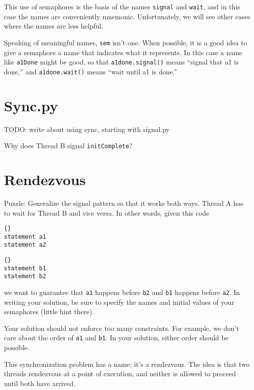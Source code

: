 \documentclass{book}
\begin{document}
This use of semaphores is the basis of the names {\tt signal}
and {\tt wait}, and in this case the names are conveniently
mnemonic.  Unfortunately, we will see other cases where the
names are less helpful.

Speaking of meaningful names, {\tt sem} isn't one.  When
possible, it is a good idea to give a semaphore a name
that indicates what it represents.  In this case a name like
{\tt a1Done} might be good, so that {\tt a1done.signal()} means
``signal that a1 is done,'' and {\tt a1done.wait()} means
``wait until a1 is done.''


\section{Sync.py}
\label{sync.py}

TODO: write about using sync, starting with signal.py

Why does Thread B signal {\tt initComplete}?



\section{Rendezvous}
\label{rendezvous}

Puzzle: Generalize the signal pattern so that it works both
ways.  Thread A has to wait for Thread B and vice versa.  In other
words, given this code

\begin{minipage}[t]{2in}
\begin{lstlisting}[title={Thread A}]{}
statement a1
statement a2
\end{lstlisting}
\end{minipage}
\hfill
\begin{minipage}[t]{2in}
\begin{lstlisting}[title={Thread B}]{}
statement b1
statement b2
\end{lstlisting}
\end{minipage}
%
we want to guarantee that {\tt a1} happens before {\tt b2} and
{\tt b1} happens before {\tt a2}.  In writing your solution, be sure
to specify the names and initial values of your semaphores
(little hint there).

Your solution should not enforce too many constraints.  For example,
we don't care about the order of {\tt a1} and {\tt b1}.  In your
solution, either order should be possible.

This synchronization problem has a name; it's a
rendezvous.  The idea is that two threads rendezvous
at a point of execution, and neither is allowed to proceed
until both have arrived.
\end{document}
